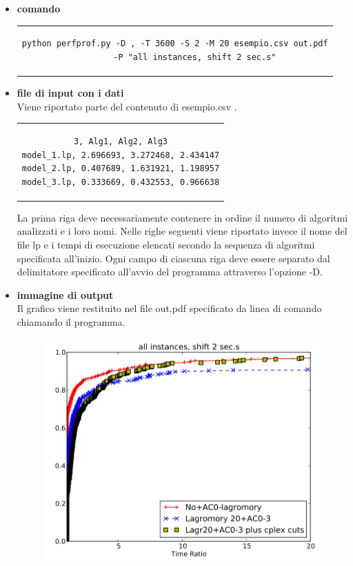 \begin{itemize}
\item{\textbf{comando}
\begin{center}
\begin{tabular}{c}
\begin{lstlisting}[linewidth=330pt, basicstyle=\footnotesize\sffamily,] 
python perfprof.py -D , -T 3600 -S 2 -M 20 esempio.csv out.pdf
		-P "all instances, shift 2 sec.s"
\end{lstlisting}
\end{tabular}
\end{center}
}
\item{\textbf{file di input con i dati}\\
Viene riportato parte del contenuto di esempio.csv .
\begin{center}
\begin{tabular}{c}
\begin{lstlisting}[linewidth=240pt, basicstyle=\footnotesize\sffamily,] 
3, Alg1, Alg2, Alg3
model_1.lp, 2.696693, 3.272468, 2.434147
model_2.lp, 0.407689, 1.631921, 1.198957
model_3.lp, 0.333669, 0.432553, 0.966638
\end{lstlisting}
\end{tabular}
\end{center}
La prima riga deve necessariamente contenere in ordine il numero di algoritmi analizzati e i loro nomi. Nelle righe seguenti viene riportato invece il nome del file lp e i tempi di esecuzione elencati secondo la sequenza di algoritmi specificata all'inizio.
Ogni campo di ciascuna riga deve essere separato dal delimitatore specificato all'avvio del programma attraverso l'opzione -D.
}
\item{\textbf{immagine di output}\\
Il grafico viene restituito nel file out.pdf specificato da linea di comando chiamando il programma.
\begin{figure}[h] 
\begin{center} 
  \includegraphics[scale=0.6]{Images/profile_out}\\ 
\end{center} 
\end{figure}
}
\end{itemize}